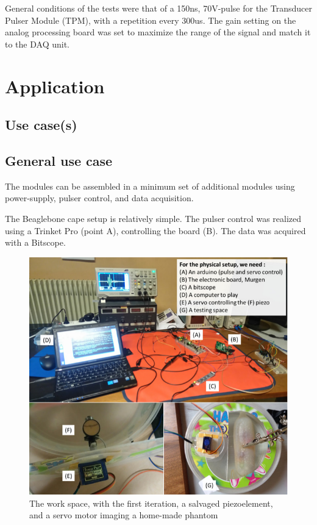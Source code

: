 \documentclass[letterpaper, 10 pt, conference]{ieeeconf} %
\begin{document}
General conditions of the tests were that of a 150ns, 70V-pulse for the Transducer Pulser Module (TPM), with a repetition every 300us. The gain setting on the analog processing board was set to maximize the range of the signal and match it to the DAQ unit.

\section{Application}

\subsection{Use case(s)}

\subsection{General use case}

The modules can be assembled in a minimum set of additional modules using power-supply, pulser control, and data acquisition.

The Beaglebone cape setup is relatively simple. The pulser control was realized using a Trinket Pro (point A), controlling the board (B). The data was acquired with a Bitscope.

\begin{figure}%
\centering
\includegraphics[width=.8\linewidth]{space}
\caption{The work space, with the first iteration, a salvaged piezoelement, and a servo motor imaging a home-made phantom}
\label{fig:workspace}
\end{figure}
\end{document}
